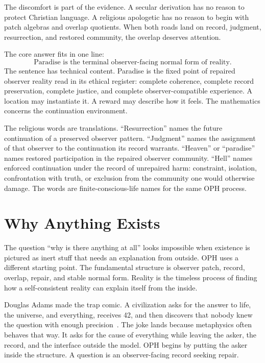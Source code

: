 \documentclass[11pt]{article}
\theoremstyle{remark}
\theoremstyle{plain}
\begin{document}
The discomfort is part of the evidence. A secular derivation has no reason to
protect Christian language. A religious apologetic has no reason to begin with
patch algebras and overlap quotients. When both roads land on record,
judgment, resurrection, and restored community, the overlap deserves attention.

The core answer fits in one line:
\[
\boxed{
\text{Paradise is the terminal observer-facing normal form of reality.}
}
\]
The sentence has technical content. Paradise is the fixed point of repaired
observer reality read in its ethical register: complete coherence, complete
record preservation, complete justice, and complete observer-compatible
experience. A location may instantiate it. A reward may describe how it feels.
The mathematics concerns the continuation environment.

The religious words are translations. ``Resurrection'' names the
future continuation of a preserved observer pattern. ``Judgment'' names the
assignment of that observer to the continuation its record warrants. ``Heaven''
or ``paradise'' names restored participation in the repaired observer
community. ``Hell'' names enforced continuation under the record of unrepaired
harm: constraint, isolation, confrontation with truth, or exclusion from the
community one would otherwise damage. The words are finite-conscious-life names
for the same OPH process.

\section{Why Anything Exists}

The question ``why is there anything at all'' looks impossible when existence
is pictured as inert stuff that needs an explanation from outside. OPH uses a
different starting point. The fundamental structure is observer patch, record,
overlap, repair, and stable normal form. Reality is the timeless process of
finding how a self-consistent reality can explain itself from the inside.

Douglas Adams made the trap comic. A civilization asks for the answer to life,
the universe, and everything, receives 42, and then discovers that nobody knew
the question with enough precision~\cite{Adams1979}. The joke lands because
metaphysics often behaves that way. It asks for the cause of everything while
leaving the asker, the record, and the interface outside the model. OPH begins
by putting the asker inside the structure. A question is an observer-facing
record seeking repair.
\end{document}
